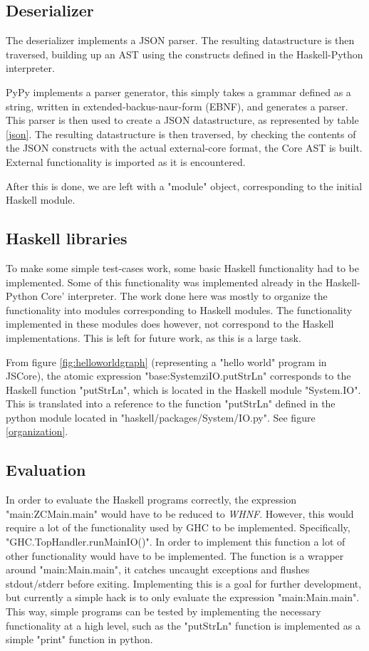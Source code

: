\subsection{Deserializer}

The deserializer implements a JSON parser. The resulting datastructure is then traversed, building up
an AST using the constructs defined in the Haskell-Python interpreter. 

PyPy implements a parser generator, this simply takes a grammar defined as a string, written in
extended-backus-naur-form (EBNF), and generates a parser. This parser is then used to create a 
JSON datastructure, as represented by table \ref{json}.
The resulting datastructure is then traversed, by checking the contents of the JSON constructs
with the actual external-core format, the Core AST is built. External functionality is imported
as it is encountered. 

After this is done, we are left with a "module" object, corresponding to the initial Haskell
module. 

\subsection{Haskell libraries}

To make some simple test-cases work, some basic Haskell functionality had to be implemented.
Some of this functionality was implemented already in the Haskell-Python Core' interpreter.
The work done here was mostly to organize the functionality into modules corresponding
to Haskell modules. The functionality implemented in these modules does however, not correspond
to the Haskell implementations. This is left for future work, as this is a large task.

From figure \ref{fig:helloworldgraph} (representing a "hello world" program in JSCore), the atomic 
expression "base:SystemziIO.putStrLn" corresponds
to the Haskell function "putStrLn", which is located in the Haskell module "System.IO". This is translated
into a reference to the function "putStrLn" defined in the python module located in 
"haskell/packages/System/IO.py". See figure \ref{organization}.

\subsection{Evaluation}

In order to evaluate the Haskell programs correctly, the expression "main:ZCMain.main" would have
to be reduced to \emph{WHNF}. However, this would require a lot of the functionality used by GHC
to be implemented. Specifically, "GHC.TopHandler.runMainIO()". In order to implement this function
a lot of other functionality would have to be implemented. The function is a wrapper around 
"main:Main.main", it catches uncaught exceptions and flushes stdout/stderr before exiting. 
Implementing this is a goal for further
development, but currently a simple hack is to only evaluate the expression "main:Main.main". This way,
simple programs can be tested by implementing the necessary functionality at a high level, such as the
"putStrLn" function is implemented as a simple "print" function in python.


